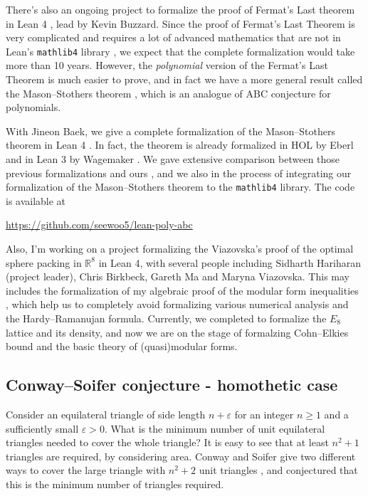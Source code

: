 \documentclass[12pt]{article}
\begin{document}
There's also an ongoing project to formalize the proof of Fermat's Last theorem in Lean 4 \cite{fltlean4}, lead by Kevin Buzzard.
Since the proof of Fermat's Last Theorem is very complicated and requires a lot of advanced mathematics that are not in Lean's \texttt{mathlib4} library \cite{mathlib4}, we expect that the complete formalization would take more than 10 years.
However, the \emph{polynomial} version of the Fermat's Last Theorem is much easier to prove, and in fact we have a more general result called the Mason--Stothers theorem \cite{stothers81,mason84}, which is an analogue of ABC conjecture for polynomials.

With Jineon Baek, we give a complete formalization of the Mason--Stothers theorem in Lean 4 \cite{baek2024formalizing}.
In fact, the theorem is already formalized in HOL by Eberl \cite{eberl17} and in Lean 3 by Wagemaker \cite{wagemaker18}.
We gave extensive comparison between those previous formalizations and ours \cite[Section 7]{baek2024formalizing}, and we also in the process of integrating our formalization of the Mason--Stothers theorem to the \texttt{mathlib4} library.
The code is available at
\begin{center}
    \url{https://github.com/seewoo5/lean-poly-abc}
\end{center}

Also, I'm working on a project formalizing the Viazovska's \cite{viazovska2017sphere} proof of the optimal sphere packing in $\mathbb{R}^{8}$ in Lean 4, with several people including Sidharth Hariharan (project leader), Chris Birkbeck, Gareth Ma and Maryna Viazovska.
This may includes the formalization of my algebraic proof of the modular form inequalities \cite{lee2024algebraic}, which help us to completely avoid formalizing  various numerical analysis and the Hardy--Ramanujan formula.
Currently, we completed to formalize the $E_8$ lattice and its density, and now we are on the stage of formalzing Cohn--Elkies bound and the basic theory of (quasi)modular forms.


\subsection*{Conway--Soifer conjecture - homothetic case}

Consider an equilateral triangle of side length $n + \varepsilon$ for an integer $n \geq 1$ and a sufficiently small $\varepsilon > 0$.
What is the minimum number of unit equilateral triangles needed to cover the whole triangle?
It is easy to see that at least $n^2 + 1$ triangles are required, by considering area.
Conway and Soifer give two different ways to cover the large triangle with $n^2 + 2$ unit triangles \cite{conway2005covering}, and conjectured that this is the minimum number of triangles required.
\end{document}
